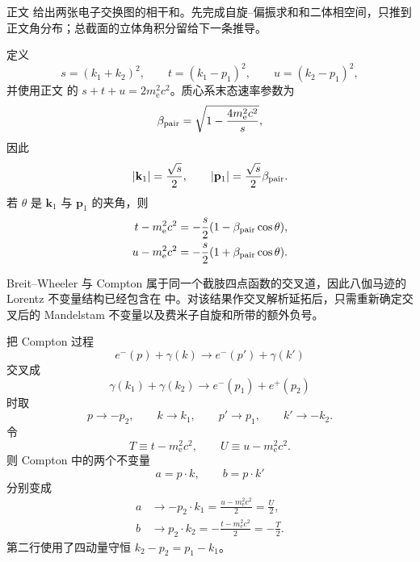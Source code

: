 \begin{derivation}[双光子产生电子对的角分布]
正文 给出两张电子交换图的相干和。先完成自旋--偏振求和和二体相空间，只推到正文角分布；总截面的立体角积分留给下一条推导。

定义
\begin{equation*}
 s=(k_1+k_2)^2,\qquad
 t=(k_1-p_1)^2,\qquad
 u=(k_2-p_1)^2,
\end{equation*}
并使用正文 的 $s+t+u=2m_{\mathrm e}^2c^2$。质心系末态速率参数为
\begin{equation*}
 \beta_{\rm pair}=\sqrt{1-\frac{4m_{\mathrm e}^2c^2}{s}},
\end{equation*}
因此
\begin{equation*}
 |\mathbf k_1|=\frac{\sqrt s}{2},\qquad
 |\mathbf p_1|=\frac{\sqrt s}{2}\beta_{\rm pair}.
\end{equation*}
若 $\theta$ 是 $\mathbf k_1$ 与 $\mathbf p_1$ 的夹角，则
\begin{align*}
 t-m_{\mathrm e}^2c^2&=-\frac{s}{2}(1-\beta_{\rm pair}\cos\theta),\\
 u-m_{\mathrm e}^2c^2&=-\frac{s}{2}(1+\beta_{\rm pair}\cos\theta).
\end{align*}

Breit--Wheeler 与 Compton 属于同一个截肢四点函数的交叉道，因此八伽马迹的 Lorentz 不变量结构已经包含在 中。对该结果作交叉解析延拓后，只需重新确定交叉后的 Mandelstam 不变量以及费米子自旋和所带的额外负号。

把 Compton 过程
\begin{equation*}
 e^-(p)+\gamma(k)\to e^-(p')+\gamma(k')
\end{equation*}
交叉成
\begin{equation*}
 \gamma(k_1)+\gamma(k_2)\to e^-(p_1)+e^+(p_2)
\end{equation*}
时取
\begin{equation*}
 p\to-p_2,
 \qquad
 k\to k_1,
 \qquad
 p'\to p_1,
 \qquad
 k'\to-k_2.
\end{equation*}
令
\begin{equation*}
 T\equiv t-m_{\mathrm e}^2c^2,
 \qquad
 U\equiv u-m_{\mathrm e}^2c^2.
\end{equation*}
则 Compton 中的两个不变量
\begin{equation*}
 a=p\cdot k,
 \qquad
 b=p\cdot k'
\end{equation*}
分别变成
\begin{align*}
 a&\to-p_2\cdot k_1
 =\frac{u-m_{\mathrm e}^2c^2}{2}=\frac U2,\\
 b&\to p_2\cdot k_2
 =-\frac{t-m_{\mathrm e}^2c^2}{2}=-\frac T2.
\end{align*}
第二行使用了四动量守恒 $k_2-p_2=p_1-k_1$。


\end{derivation}
